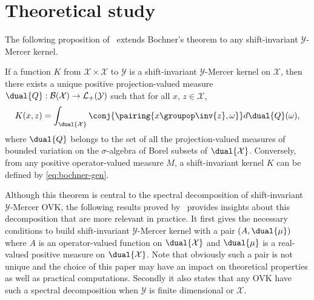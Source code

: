 \section{Theoretical study}
\label{sec:theoretical_study}
The following proposition of~\citet{Zhang2012,Carmeli2010} extends Bochner's
theorem to any shift-invariant $\mathcal{Y}$-Mercer kernel.
\begin{proposition}
    \label{pr:operator_valued_bochner}
    If a function $K$ from $\mathcal{X} \times \mathcal{X}$ to $\mathcal{Y}$ is
    a shift-invariant $\mathcal{Y}$-Mercer kernel on $\mathcal{X}$, then there
    exists a unique positive projection-valued measure $\dual{Q}:
    \mathcal{B}(\mathcal{X}) \to
    \mathcal{L}_+(\mathcal{Y})$ such that for all $x$, $z \in \mathcal{X}$,
    \begin{dmath}
        \label{eq:bochner-gen}
        K(x, z) = \int_{\dual{\mathcal{X}}} \conj{\pairing{x \groupop \inv{z},
        \omega}} d\dual{Q}(\omega),
    \end{dmath}
    where $\dual{Q}$ belongs to the set of all the projection-valued measures
    of bounded variation on the $\sigma$-algebra of Borel subsets of
    $\dual{\mathcal{X}}$. Conversely, from any positive operator-valued measure
    $M$, a shift-invariant kernel $K$ can be defined by \cref{eq:bochner-gen}.
\end{proposition}
Although this theorem is central to the spectral decomposition of
shift-invariant $\mathcal{Y}$-Mercer \acs{OVK}, the following results proved
by~\citet{Carmeli2010} provides insights about this decomposition that are more
relevant in practice. It first gives the necessary conditions to build
shift-invariant $\mathcal{Y}$-Mercer kernel with a pair $(A, \dual{\mu})$ where
$A$ is an operator-valued function on $\dual{\mathcal{X}}$ and $\dual{\mu}$ is
a real-valued positive measure on $\dual{\mathcal{X}}$. Note that obviously
such a pair is not unique and the choice of this paper may have an impact on
theoretical properties as well as practical computations.  Secondly it also
states that any \acs{OVK} have such a spectral decomposition when $\mathcal{Y}$
is finite dimensional or $\mathcal{X}$.

